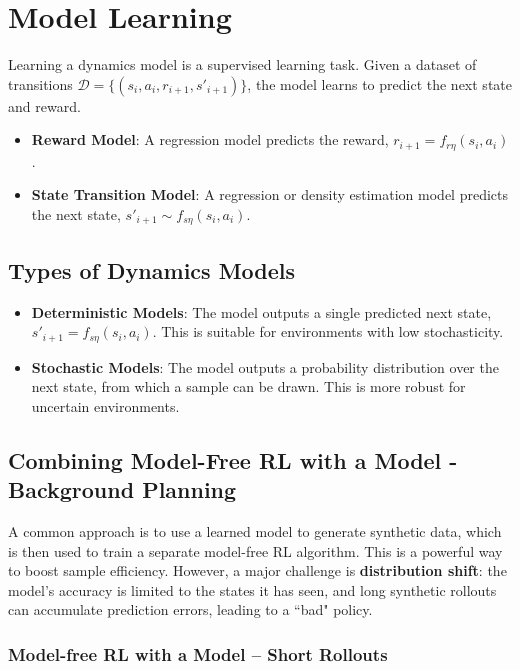 \documentclass[12pt]{article}
\begin{document}
\section{Model Learning }
Learning a dynamics model is a supervised learning task. Given a dataset of transitions $\mathcal{D} = \{(s_i, a_i, r_{i+1}, s'_{i+1})\}$, the model learns to predict the next state and reward.
\begin{itemize}
    \item \textbf{Reward Model}: A regression model predicts the reward, $r_{i+1} = f_{r\eta}(s_i, a_i)$.
    \item \textbf{State Transition Model}: A regression or density estimation model predicts the next state, $s'_{i+1} \sim f_{s\eta}(s_i, a_i)$.
\end{itemize}

\subsection{Types of Dynamics Models}
\begin{itemize}
    \item \textbf{Deterministic Models}: The model outputs a single predicted next state, $s'_{i+1} = f_{s\eta}(s_i, a_i)$. This is suitable for environments with low stochasticity.
    \item \textbf{Stochastic Models}: The model outputs a probability distribution over the next state, from which a sample can be drawn. This is more robust for uncertain environments.
\end{itemize}

\subsection{Combining Model-Free RL with a Model - Background Planning}
A common approach is to use a learned model to generate synthetic data, which is then used to train a separate model-free RL algorithm. This is a powerful way to boost sample efficiency. However, a major challenge is \textbf{distribution shift}: the model's accuracy is limited to the states it has seen, and long synthetic rollouts can accumulate prediction errors, leading to a ``bad" policy.


\subsubsection{Model-free RL with a Model -- Short Rollouts}
\end{document}
